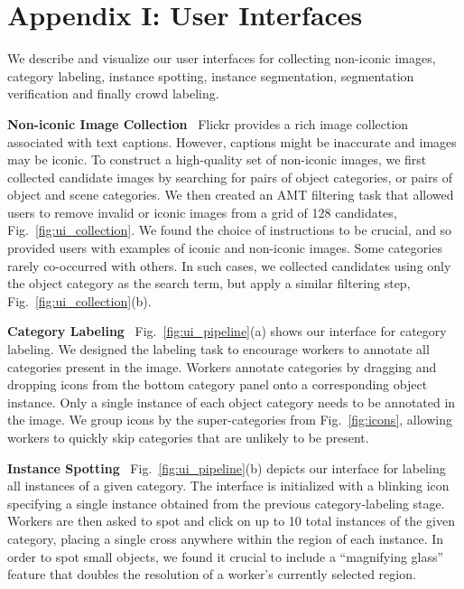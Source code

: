 \section*{Appendix I: User Interfaces}

We describe and visualize our user interfaces for collecting non-iconic images, category labeling, instance spotting, instance segmentation, segmentation verification and finally crowd labeling.

\textbf{Non-iconic Image Collection}~ Flickr provides a rich image collection associated with text captions. However, captions might be inaccurate and images may be iconic. To construct a high-quality set of non-iconic images, we first collected candidate images by searching for pairs of object categories, or pairs of object and scene categories. We then created an AMT filtering task that allowed users to remove invalid or iconic images from a grid of 128 candidates, Fig.~\ref{fig:ui_collection}. We found the choice of instructions to be crucial, and so provided users with examples of iconic and non-iconic images. Some categories rarely co-occurred with others. In such cases, we collected candidates using only the object category as the search term, but apply a similar filtering step, Fig.~\ref{fig:ui_collection}(b).

\textbf{Category Labeling}~ Fig.~\ref{fig:ui_pipeline}(a) shows our interface for category labeling. We designed the labeling task to encourage workers to annotate all categories present in the image. Workers annotate categories by dragging and dropping icons from the bottom category panel onto a corresponding object instance. Only a single instance of each object category needs to be annotated in the image. We group icons by the super-categories from Fig.~\ref{fig:icons}, allowing workers to quickly skip categories that are unlikely to be present.

\textbf{Instance Spotting}~ Fig.~\ref{fig:ui_pipeline}(b) depicts our interface for labeling all instances of a given category. The interface is initialized with a blinking icon specifying a single instance obtained from the previous category-labeling stage. Workers are then asked to spot and click on up to 10 total instances of the given category, placing a single cross anywhere within the region of each instance. In order to spot small objects, we found it crucial to include a ``magnifying glass'' feature that doubles the resolution of a worker's currently selected region.

